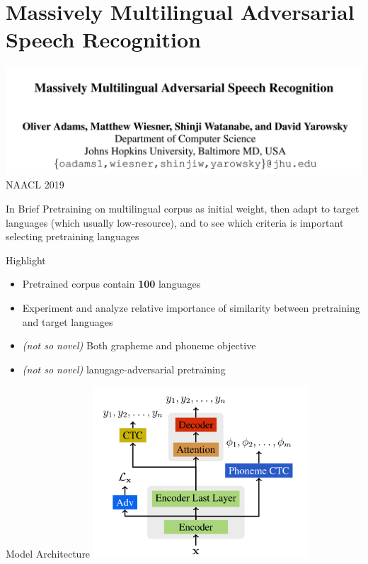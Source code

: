 \documentclass{beamer}
\begin{document}
\section{Massively Multilingual Adversarial Speech Recognition}
\begin{frame}
  \includegraphics[width=\textwidth]{fig/p2-title.png}
  \center NAACL 2019
\end{frame}

\begin{frame}{In Brief}
  Pretraining on multilingual corpus as initial weight, then adapt to target languages (which usually low-resource), and to see which criteria is important selecting pretraining languages
\end{frame}

\begin{frame}{Highlight}
  \begin{itemize}
    \item Pretrained corpus contain \textbf{100} languages
    \item Experiment and analyze relative importance of similarity between pretraining and target languages
    \item \textit{(not so novel)} Both grapheme and phoneme objective
    \item \textit{(not so novel)} lanugage-adversarial pretraining
  \end{itemize}
\end{frame}

\begin{frame}{Model Architecture}
  \center \includegraphics[width=0.6\textwidth]{fig/p2-arch.png}
\end{frame}
\end{document}

